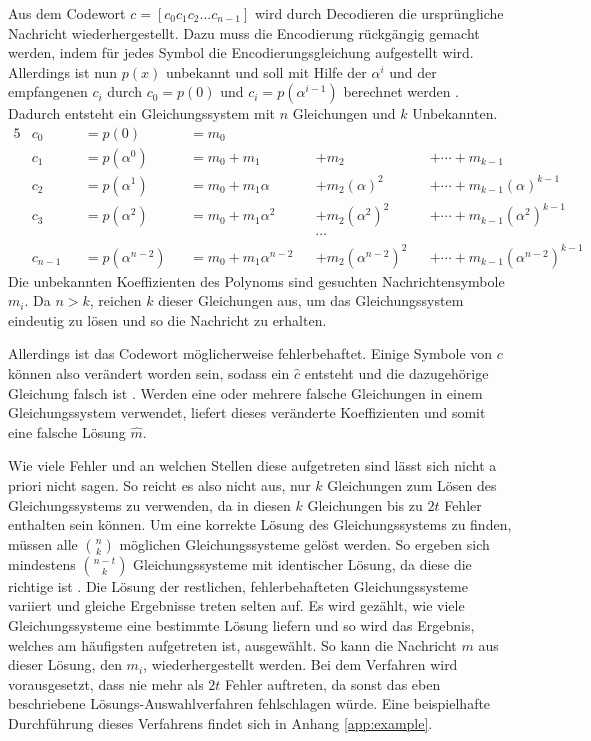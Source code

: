 Aus dem Codewort $c=[c_{0}c_{1}c_{2}...c_{n-1}]$ wird durch Decodieren die ursprüngliche Nachricht wiederhergestellt.
Dazu muss die Encodierung rückgängig gemacht werden, indem für jedes Symbol die Encodierungsgleichung aufgestellt wird. 
Allerdings ist nun $p(x)$ unbekannt und soll mit Hilfe der $\alpha^i$ und der empfangenen $c_i$ durch $c_0=p(0)$ und $c_i=p(\alpha^{i-1})$ berechnet werden \cite{reedPolynomialCodesCertain1960}.
Dadurch entsteht ein Gleichungssystem mit $n$ Gleichungen und $k$ Unbekannten.
\begin{alignat}{5}
	&c_0&&=p(0)&&=m_0\nonumber\\
	&c_1&&=p(\alpha^0)&&=m_0+m_1&&+m_2&&+\cdots+m_{k-1}\nonumber\\
	&c_2&&=p(\alpha^1)&&=m_0+m_1 \alpha&&+m_2 (\alpha)^2&&+\cdots+m_{k-1} (\alpha)^{k-1}\nonumber\\
	&c_3&&=p(\alpha^2)&&=m_0+m_1 \alpha^2&&+m_2 (\alpha^2)^2&&+\cdots+m_{k-1} (\alpha^2)^{k-1}\nonumber\\
	&&&&&&&\cdots\nonumber\\
	&c_{n-1}&&=p(\alpha^{n-2})&&=m_0+m_1 \alpha^{n-2}&&+m_2 (\alpha^{n-2})^2&&+\cdots+m_{k-1} (\alpha^{n-2})^{k-1}\nonumber
\end{alignat}
Die unbekannten Koeffizienten des Polynoms sind gesuchten Nachrichtensymbole $m_i$. 
Da $n>k$, reichen $k$ dieser Gleichungen aus, um das Gleichungssystem eindeutig zu lösen und so die Nachricht zu erhalten.

Allerdings ist das Codewort möglicherweise fehlerbehaftet. 
Einige Symbole von $c$ können also verändert worden sein, sodass ein $\hat{c}$ entsteht und die dazugehörige Gleichung falsch ist \cite{verbeureReedSolomonErrorCorrecting2022}.
Werden eine oder mehrere falsche Gleichungen in einem Gleichungssystem verwendet, liefert dieses veränderte Koeffizienten und somit eine falsche Lösung $\hat{m}$.

Wie viele Fehler und an welchen Stellen diese aufgetreten sind lässt sich nicht a priori nicht sagen. 
So reicht es also nicht aus, nur $k$ Gleichungen zum Lösen des Gleichungssystems zu verwenden, da in diesen $k$ Gleichungen bis zu $2t$ Fehler enthalten sein können.
Um eine korrekte Lösung des Gleichungssystems zu finden, müssen alle $\binom{n}{k}$ möglichen Gleichungssysteme gelöst werden.
So ergeben sich mindestens $\binom{n-t}{k}$ Gleichungssysteme mit identischer Lösung, da diese die richtige ist \cite{reedPolynomialCodesCertain1960}.
Die Lösung der restlichen, fehlerbehafteten Gleichungssysteme variiert und gleiche Ergebnisse treten selten auf.
Es wird gezählt, wie viele Gleichungssysteme eine bestimmte Lösung liefern und so wird das Ergebnis, welches am häufigsten aufgetreten ist, ausgewählt. 
So kann die Nachricht $m$ aus dieser Lösung, den $m_i$, wiederhergestellt werden.
Bei dem Verfahren wird vorausgesetzt, dass nie mehr als $2t$ Fehler auftreten, da sonst das eben beschriebene Lösungs-Auswahlverfahren fehlschlagen würde.
Eine beispielhafte Durchführung dieses Verfahrens findet sich in Anhang \ref{app:example}.

